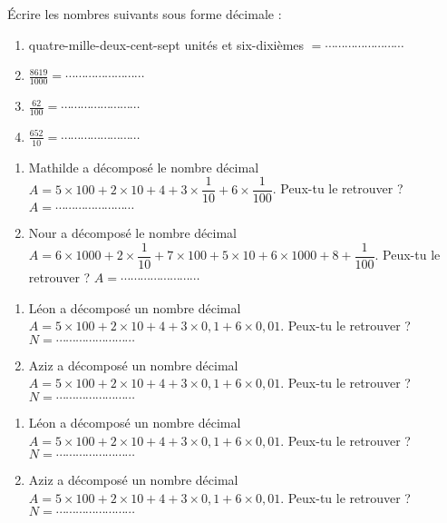 \begin{minipage}{0.5\linewidth}


Écrire les nombres suivants sous forme décimale :
\begin{enumerate}
\item quatre-mille-deux-cent-sept unités et six-dixièmes $= \cdots\cdots\cdots\cdots\cdots\cdots\cdots\cdots $
\item $\frac{8619}{1000}= \cdots\cdots\cdots\cdots\cdots\cdots\cdots\cdots$
\item $\frac{62}{100}= \cdots\cdots\cdots\cdots\cdots\cdots\cdots\cdots$
\item $\frac{652}{10}= \cdots\cdots\cdots\cdots\cdots\cdots\cdots\cdots$
\end{enumerate}
 


\begin{enumerate}
\item Mathilde a décomposé le nombre décimal  $A = 5\times 100 + 2\times 10 + 4 + 3\times \dfrac{1}{10} +  6\times \dfrac{1}{100} $. Peux-tu le retrouver ?
$A = \cdots\cdots\cdots\cdots\cdots\cdots\cdots\cdots $

\item Nour a décomposé le nombre décimal  $A = 6\times 1000 + 2\times \dfrac{1}{10} +  7\times 100 + 5\times 10 + 6\times 1000 + 8 +   \dfrac{1}{100} $. Peux-tu le retrouver ?
$A = \cdots\cdots\cdots\cdots\cdots\cdots\cdots\cdots $
\end{enumerate}



\begin{enumerate}
\item Léon a décomposé un nombre décimal  $A = 5\times 100 + 2\times 10 + 4 + 3\times 0,1 +  6\times 0,01 $. Peux-tu le retrouver ?
$N = \cdots\cdots\cdots\cdots\cdots\cdots\cdots\cdots $

\item Aziz a décomposé un nombre décimal  $A = 5\times 100 + 2\times 10 + 4 + 3\times 0,1 +  6\times 0,01 $. Peux-tu le retrouver ?
$N = \cdots\cdots\cdots\cdots\cdots\cdots\cdots\cdots $

\end{enumerate}


\begin{enumerate}
\item Léon a décomposé un nombre décimal  $A = 5\times 100 + 2\times 10 + 4 + 3\times 0,1 +  6\times 0,01 $. Peux-tu le retrouver ?
$N = \cdots\cdots\cdots\cdots\cdots\cdots\cdots\cdots $

\item Aziz a décomposé un nombre décimal  $A = 5\times 100 + 2\times 10 + 4 + 3\times 0,1 +  6\times 0,01 $. Peux-tu le retrouver ?
$N = \cdots\cdots\cdots\cdots\cdots\cdots\cdots\cdots $

\end{enumerate}

\end{minipage}


